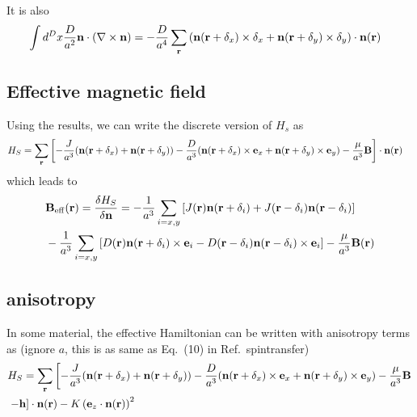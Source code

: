 \documentclass[aps,superscriptaddress,groupedaddress]{revtex4}  %
\begin{document}
It is also
\begin{equation}
\begin{split}
&\int d^D x\frac{D}{a^2}{\bf n}\cdot (\nabla \times {\bf n})=-\frac{D}{a^4}\sum _{{\bf r}}\left({\bf n}({\bf r}+\delta _x)\times \delta _x+{\bf n}({\bf r}+\delta _y)\times \delta _y\right)\cdot {\bf n}({\bf r})
\end{split}
\end{equation}

\subsection{\label{sec:2.4}Effective magnetic field}

Using the results, we can write the discrete version of $H_s$ as
\begin{equation}
\begin{split}
&H_S=\sum _{{\bf r}}\left[-\frac{J}{a^3} ({\bf n}({\bf r}+\delta_x)+{\bf n}({\bf r}+\delta_y))-\frac{D}{a^3}  ({\bf n}({\bf r}+\delta_x)\times {{\bf e}}_x+{\bf n}({\bf r}+\delta_y)\times {{\bf e}}_y)-\frac{\mu}{a^3}{\bf B}\right]\cdot {\bf n}({\bf r})
\end{split}
\end{equation}
which leads to
\begin{equation}
\begin{split}
&{\bf B}_{\rm eff}({\bf r})=\frac{\delta H_S}{\delta {\bf n}}=-\frac{1}{a^3} \sum _{i=x,y}\left[J({\bf r}){\bf n}({\bf r}+\delta_i)+J({\bf r}-\delta_i){\bf n}({\bf r}-\delta_i)\right]\\
&-\frac{1}{a^3}  \sum _{i=x,y}\left[D({\bf r}){\bf n}({\bf r}+\delta_i)\times {{\bf e}}_i-D({\bf r}-\delta _i){\bf n}({\bf r}-\delta_i)\times {{\bf e}}_i\right]-\frac{\mu}{a^3}{\bf B}({\bf r})
\end{split}
\end{equation}

\subsection{\label{sec:2.5}anisotropy}

In some material, the effective Hamiltonian can be written with anisotropy terms as (ignore $a$, this is as same as Eq.~(10) in Ref.~{spintransfer})
\begin{equation}
\begin{split}
&H_S=\sum _{{\bf r}}\left[-\frac{J}{a^3} ({\bf n}({\bf r}+\delta_x)+{\bf n}({\bf r}+\delta_y))-\frac{D}{a^3}  ({\bf n}({\bf r}+\delta_x)\times {{\bf e}}_x+{\bf n}({\bf r}+\delta_y)\times {{\bf e}}_y)-\frac{\mu}{a^3}{\bf B}\right.\\
&\left.-{\bf h}\right]\cdot {\bf n}({\bf r})-K\left({\bf e}_z\cdot {\bf n}({\bf r})\right)^2
\end{split}
\end{equation}
\end{document}
